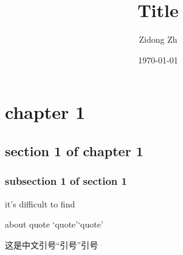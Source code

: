 \documentclass{ctexart}
\title{Title}
\author{Zidong Zh}
\date{\today}
\begin{document}
    \maketitle

    \newpage

    \tableofcontents
    
    \setcounter{page}{0}

    \thispagestyle{empty}

    \newpage


    \section{chapter 1}

    \subsection{section 1 of chapter 1}

    \subsubsection{subsection 1 of section 1 }

    

    it's dif{}f{}icult to f{}ind 

    about quote `quote'`quote'

    这是中文引号“引号”引号
    
\end{document}
